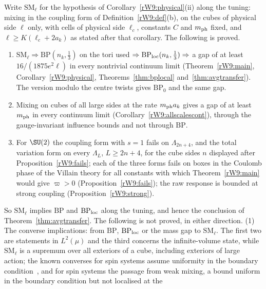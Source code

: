 \begin{remark}\label{rW9:relations}
Write $\mathrm{SM}_\ell$ for the hypothesis of
Corollary~\ref{rW9:physical}(ii) along the tuning: mixing in the coupling
form of Definition~\ref{rW9:def}(b), on the cubes of physical side $\ell$
only, with cells of physical side $\ell_c$, constants $C$ and $m_{\rm ph}$ fixed, and
$\ell\ge K(\ell_c+2a_k)$ as stated after that corollary. The following is
proved.
\begin{enumerate}[label=\textup{(\alph*)},leftmargin=*]
\item $\mathrm{SM}_\ell\Rightarrow\mathrm{BP}(n_k,\frac13)$ on the tori used
$\Rightarrow\mathrm{BP}_{\rm loc}(n_k,\frac13)\Rightarrow$ a gap of at least
$16/(1875e^2\ell)$ in every nontrivial continuum limit
(Theorem~\ref{rW9:main}, Corollary~\ref{rW9:physical},
Theorems~\ref{thm:bplocal} and~\ref{thm:avgtransfer}). The version modulo
the centre twists gives $\mathrm{BP}_0$ and the same gap.
\item Mixing on cubes of all large sides at the rate $m_{\rm ph} a_k$ gives a gap of
at least $m_{\rm ph}$ in every continuum limit (Corollary~\ref{rW9:allscalescont}),
through the gauge-invariant influence bounds and not through $\mathrm{BP}$.
\item For $\SU(2)$ the coupling form with $s=1$ fails on $\Lambda_{2n+4}$,
and the total variation form on every $\Lambda_L$, $L\ge2n+4$, for the cube
sides $n$ displayed after Proposition~\ref{rW9:fails}; each of the three forms
fails on boxes in the Coulomb phase of the Villain theory for all constants with which Theorem~\ref{rW9:main} would give $\varpi>0$
(Proposition~\ref{rW9:fails}); the raw response is bounded at strong
coupling (Proposition~\ref{rW9:strong}).
\end{enumerate}
So $\mathrm{SM}_\ell$ implies $\mathrm{BP}$ and $\mathrm{BP}_{\rm loc}$ along
the tuning, and hence the conclusion of Theorem~\ref{thm:avgtransfer}. The
following is not proved, in either direction. (1) The converse implications: from
$\mathrm{BP}$, $\mathrm{BP}_{\rm loc}$ or the mass gap to $\mathrm{SM}_\ell$.
The first two are statements in $L^2(\mu)$ and the third concerns the
infinite-volume state, while $\mathrm{SM}_\ell$ is a supremum over all
exteriors of a cube, including exteriors of large action; the known converses
for spin systems assume uniformity in the boundary
condition~\cite{SZ92a,Mar99}, and for spin systems the passage from weak
mixing, a bound uniform in the boundary condition but not localised at the

\end{remark}
